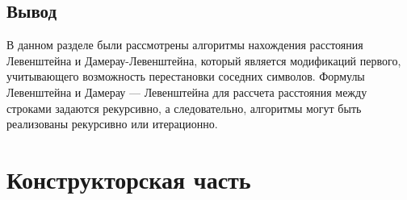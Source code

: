 \documentclass[12pt]{report}
\begin{document}
\section{Вывод}
	В данном разделе были рассмотрены алгоритмы нахождения расстояния Левенштейна и Дамерау-Левенштейна, который является модификаций первого, учитывающего возможность перестановки соседних символов. Формулы Левенштейна и Дамерау — Левенштейна для рассчета расстояния между строками задаются рекурсивно, а следовательно, алгоритмы могут быть реализованы рекурсивно или итерационно.
	
\clearpage

\chapter{Конструкторская часть}
\end{document}
